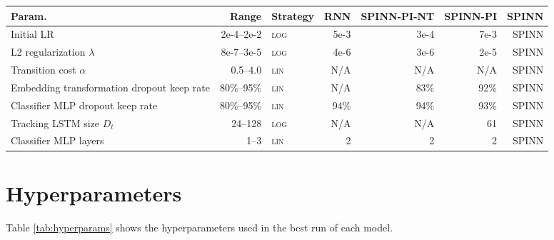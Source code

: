 \documentclass[11pt]{article}
\newcommand\result[1]{\textcolor{red}{\textbf{RESULT NEEDED:} #1}}
\def\ii#1{\textit{#1}}
\begin{document}
\begin{table*}[t]\small
\begin{center}
\begin{tabular}{lrlrrrr}
\toprule
Param.     & Range & Strategy        & RNN       & SPINN-PI-NT   & SPINN-PI  & SPINN \\
\midrule 
Initial LR & 2e-4--2e-2 & \textsc{log} & 5e-3  & 3e-4 & 7e-3  & SPINN\\
L2 regularization $\lambda$ & 8e-7--3e-5   & \textsc{log} & 4e-6  & 3e-6   & 2e-5  & SPINN\\
Transition cost $\alpha$  & 0.5--4.0 & \textsc{lin} & N/A & N/A & N/A  & SPINN\\
Embedding transformation dropout keep rate & 80\%--95\% & \textsc{lin} & N/A & 83\% & 92\%  & SPINN\\
Classifier MLP dropout keep rate & 80\%--95\% & \textsc{lin} & 94\%  & 94\%   & 93\%  & SPINN\\
Tracking LSTM size $D_t$ & 24--128 & \textsc{log} & N/A & N/A & 61  & SPINN\\
Classifier MLP layers & 1--3 & \textsc{lin} & 2 & 2 & 2 & SPINN\\
\bottomrule
\end{tabular}
\end{center}
 
\caption{
\label{tab:hyperparams}
Hyperparameter ranges and values. \ii{Range} shows the hyperparameter ranges explored during random search. \ii{Strategy} indicates whether sampling from the range was uniform, or log--uniform. \result{[SB] Full model hyperparams.}
}
\end{table*}

\appendix
\section{Hyperparameters}\label{sec:hyperparams}

Table \ref{tab:hyperparams} shows the hyperparameters used in the best run of each model.
\end{document}
